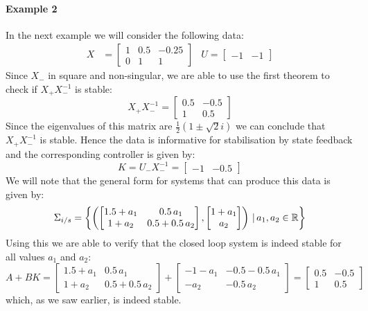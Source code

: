 \paragraph*{Example 2 \cite[Example 19]{waarde2019data}}
In the next example we will consider the following data:
\begin{align*}
X &= \begin{bmatrix} 1&0.5&-0.25 \\ 0&1&1 \end{bmatrix} & U = \begin{bmatrix}	-1&-1	\end{bmatrix}
\end{align*}
Since $X_-$ in square and non-singular, we are able to use the first theorem to check if $X_+ X_-^{-1}$ is stable:
\[ X_+ X_-^{-1} = \begin{bmatrix} 0.5&-0.5\\1&0.5 \end{bmatrix} \]
Since the eigenvalues of this matrix are $\frac{1}{2}(1 \pm \sqrt{2}i)$ we can conclude that $X_+ X_-^{-1}$ is stable. Hence the data is informative for stabilisation by state feedback and the corresponding controller is given by:
\[ K = U_- X_-^{-1} = \begin{bmatrix} -1 & -0.5 \end{bmatrix} \]
We will note that the general form for systems that can produce this data is given by:
\[ \Sigma_{i/s} = \left\{ \left( \begin{bmatrix} 1.5+a_1&0.5 \, a_1 \\ 1 + a_2 &0.5 + 0.5 \, a_2 \end{bmatrix}, \begin{bmatrix} 1 + a_1 \\ a_2 \end{bmatrix} \right) \, | \, a_1, a_2 \in \mathbb{R} \right\} \]
Using this we are able to verify that the closed loop system is indeed stable for all values $a_1$ and $a_2$:
\begin{equation*}
	A + BK = \begin{bmatrix} 1.5+a_1&0.5 \, a_1 \\ 1 + a_2 &0.5 + 0.5 \, a_2 \end{bmatrix} + \begin{bmatrix} - 1 - a_1 &  - 0.5 - 0.5 \, a_1 \\ -a_2 & -0.5 \, a_2 \end{bmatrix} = \begin{bmatrix} 0.5&-0.5\\1&0.5 \end{bmatrix}
\end{equation*}
which, as we saw earlier, is indeed stable.

